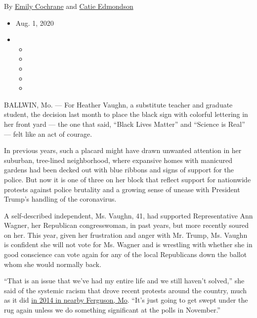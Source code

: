 By \href{https://www.nytimes.com/by/emily-cochrane}{Emily Cochrane} and
\href{https://www.nytimes.com/by/catie-edmondson}{Catie Edmondson}

\begin{itemize}
\item
  Aug. 1, 2020
\item
  \begin{itemize}
  \item
  \item
  \item
  \item
  \item
  \end{itemize}
\end{itemize}

BALLWIN, Mo. --- For Heather Vaughn, a substitute teacher and graduate
student, the decision last month to place the black sign with colorful
lettering in her front yard --- the one that said, ``Black Lives
Matter'' and ``Science is Real'' --- felt like an act of courage.

In previous years, such a placard might have drawn unwanted attention in
her suburban, tree-lined neighborhood, where expansive homes with
manicured gardens had been decked out with blue ribbons and signs of
support for the police. But now it is one of three on her block that
reflect support for nationwide protests against police brutality and a
growing sense of unease with President Trump's handling of the
coronavirus.

A self-described independent, Ms. Vaughn, 41, had supported
Representative Ann Wagner, her Republican congresswoman, in past years,
but more recently soured on her. This year, given her frustration and
anger with Mr. Trump, Ms. Vaughn is confident she will not vote for Ms.
Wagner and is wrestling with whether she in good conscience can vote
again for any of the local Republicans down the ballot whom she would
normally back.

``That is an issue that we've had my entire life and we still haven't
solved,'' she said of the systemic racism that drove recent protests
around the country, much as it did
\href{https://www.nytimes.com/interactive/2014/08/13/us/ferguson-missouri-town-under-siege-after-police-shooting.html}{in
2014 in nearby Ferguson, Mo}. ``It's just going to get swept under the
rug again unless we do something significant at the polls in November.''

